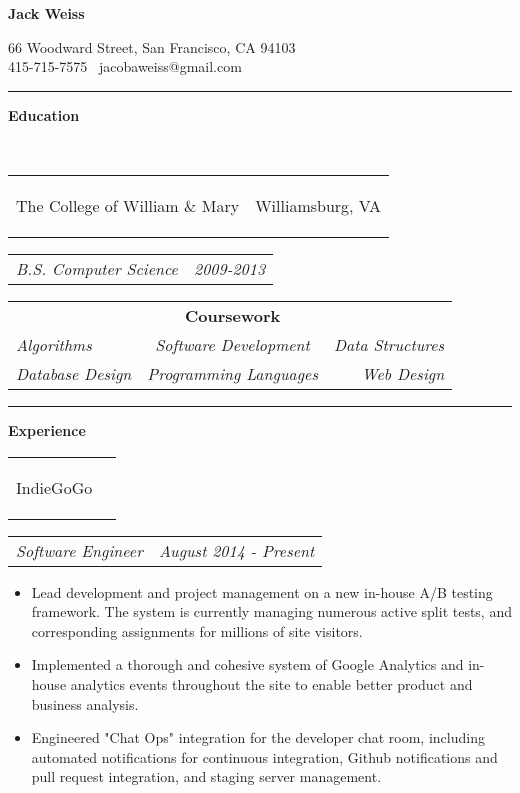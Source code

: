 \documentclass[11pt]{article}
\makeatletter
\newcommand{\headerrow}[2]
{\begin{tabular*}{\linewidth}{l@{\extracolsep{\fill}}r}
	#1 &
	#2 \\
\end{tabular*}}
\makeatother
\begin{document}
\begin{center}
	\begin{huge}
		\bf Jack Weiss
	\end{huge}

	66 Woodward Street, San Francisco, CA 94103 \\
	415-715-7575 \textbullet\ jacobaweiss@gmail.com
\end{center}
\hrule
\vspace{0.5em}

\vspace{0.8em}
\begin{LARGE}
	\bf Education
\end{LARGE}
\vspace{0.5em} \\
\headerrow
	{\begin{Large}The College of William \& Mary\end{Large}}
	{Williamsburg, VA}
\headerrow
	{\textit{B.S. Computer Science}}
	{\textit{2009-2013}}
\vspace{-1.5em}
\begin{center}
	\begin{tabular}{lcr}
		& {\bf Coursework}  & \\
		\textit{Algorithms} & \textit{Software Development} & \textit{Data Structures} \\
		\textit{Database Design} & \textit{Programming Languages} & \textit{Web Design}

	\end{tabular}
\end{center}
\hrule
\vspace{0.5em}

\vspace{0.8em}
\begin{LARGE}
	\bf Experience
\end{LARGE}
\vspace{0.5em}

	\headerrow
		{\begin{Large}IndieGoGo\end{Large}}
		{}
	\headerrow
		{\textit{Software Engineer}}
		{\textit{August 2014 - Present}}
	\begin{itemize}
		\item Lead development and project management on a new in-house A/B testing framework. The system is currently managing numerous active split tests, and corresponding assignments for millions of site visitors.
		\vspace{-0.8em}
		\item Implemented a thorough and cohesive system of Google Analytics and in-house analytics events throughout the site to enable better product and business analysis.
		\vspace{-0.8em}
		\item Engineered "Chat Ops" integration for the developer chat room, including automated notifications for continuous integration, Github notifications and pull request integration, and staging server management.
	\end{itemize}
\end{document}
